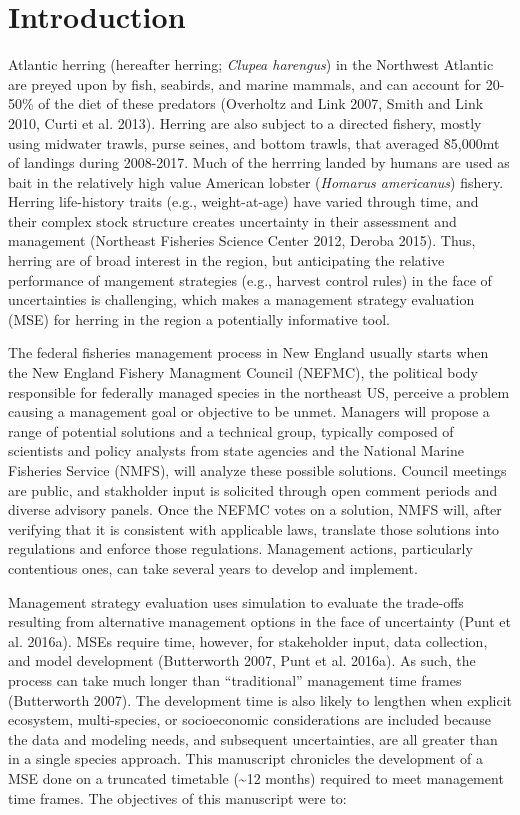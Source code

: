 \documentclass[]{article}
\begin{document}
\section{Introduction}\label{introduction}

Atlantic herring (hereafter herring; \emph{Clupea harengus}) in the
Northwest Atlantic are preyed upon by fish, seabirds, and marine
mammals, and can account for 20-50\% of the diet of these predators
(Overholtz and Link 2007, Smith and Link 2010, Curti et al. 2013).
Herring are also subject to a directed fishery, mostly using midwater
trawls, purse seines, and bottom trawls, that averaged 85,000mt of
landings during 2008-2017. Much of the herrring landed by humans are
used as bait in the relatively high value American lobster
(\emph{Homarus americanus}) fishery. Herring life-history traits (e.g.,
weight-at-age) have varied through time, and their complex stock
structure creates uncertainty in their assessment and management
(Northeast Fisheries Science Center 2012, Deroba 2015). Thus, herring
are of broad interest in the region, but anticipating the relative
performance of mangement strategies (e.g., harvest control rules) in the
face of uncertainties is challenging, which makes a management strategy
evaluation (MSE) for herring in the region a potentially informative
tool.

The federal fisheries management process in New England usually starts
when the New England Fishery Managment Council (NEFMC), the political
body responsible for federally managed species in the northeast US,
perceive a problem causing a management goal or objective to be unmet.
Managers will propose a range of potential solutions and a technical
group, typically composed of scientists and policy analysts from state
agencies and the National Marine Fisheries Service (NMFS), will analyze
these possible solutions. Council meetings are public, and stakholder
input is solicited through open comment periods and diverse advisory
panels. Once the NEFMC votes on a solution, NMFS will, after verifying
that it is consistent with applicable laws, translate those solutions
into regulations and enforce those regulations. Management actions,
particularly contentious ones, can take several years to develop and
implement.

Management strategy evaluation uses simulation to evaluate the
trade-offs resulting from alternative management options in the face of
uncertainty (Punt et al. 2016a). MSEs require time, however, for
stakeholder input, data collection, and model development (Butterworth
2007, Punt et al. 2016a). As such, the process can take much longer than
``traditional'' management time frames (Butterworth 2007). The
development time is also likely to lengthen when explicit ecosystem,
multi-species, or socioeconomic considerations are included because the
data and modeling needs, and subsequent uncertainties, are all greater
than in a single species approach. This manuscript chronicles the
development of a MSE done on a truncated timetable (\textasciitilde{}12
months) required to meet management time frames. The objectives of this
manuscript were to:
\end{document}

